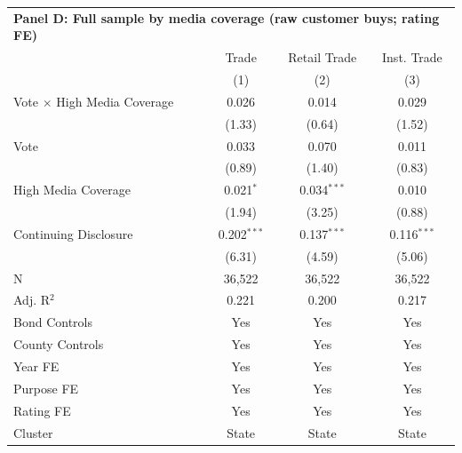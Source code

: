 \begingroup
\centering
\begin{tabular*}{\textwidth}{@{\extracolsep{\fill}}lccc}
\multicolumn{5}{l}{\textbf{Panel D: Full sample by media coverage (raw customer buys; rating FE)}}\\

\addlinespace
   \toprule
                                      & Trade         & Retail Trade  & Inst. Trade\\  
                                      & (1)           & (2)           & (3)\\  
   \midrule 
   Vote $\times$ High Media Coverage  & 0.026         & 0.014         & 0.029\\   
                                      & (1.33)       & (0.64)       & (1.52)\\   
   Vote                               & 0.033         & 0.070         & 0.011\\   
                                      & (0.89)       & (1.40)       & (0.83)\\   
   High Media Coverage                & 0.021$^{*}$   & 0.034$^{***}$ & 0.010\\   
                                      & (1.94)       & (3.25)       & (0.88)\\   
   Continuing Disclosure              & 0.202$^{***}$ & 0.137$^{***}$ & 0.116$^{***}$\\   
                                      & (6.31)       & (4.59)       & (5.06)\\   
   \hline
   N                       & 36,522        & 36,522        & 36,522\\  
   Adj. R$^2$                     & 0.221         & 0.200         & 0.217\\  
   Bond Controls                      & Yes           & Yes           & Yes\\  
   County Controls                    & Yes           & Yes           & Yes\\  
   Year FE                            & Yes           & Yes           & Yes\\  
   Purpose FE                         & Yes           & Yes           & Yes\\  
   Rating FE                          & Yes           & Yes           & Yes\\  
   Cluster              & State & State & State\\  
   \bottomrule
\end{tabular*}
\par\endgroup
